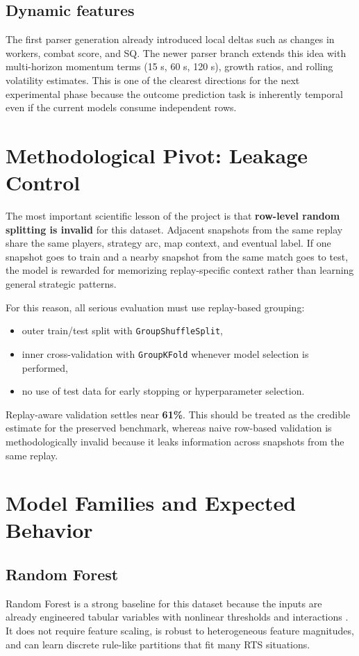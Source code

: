 \documentclass[11pt,a4paper]{article}
\begin{document}
	\subsection{Dynamic features}
	The first parser generation already introduced local deltas such as changes in workers, combat score, and SQ. The newer parser branch extends this idea with multi-horizon momentum terms (15 s, 60 s, 120 s), growth ratios, and rolling volatility estimates. This is one of the clearest directions for the next experimental phase because the outcome prediction task is inherently temporal even if the current models consume independent rows.
	
	\section{Methodological Pivot: Leakage Control}
	The most important scientific lesson of the project is that \textbf{row-level random splitting is invalid} for this dataset. Adjacent snapshots from the same replay share the same players, strategy arc, map context, and eventual label. If one snapshot goes to train and a nearby snapshot from the same match goes to test, the model is rewarded for memorizing replay-specific context rather than learning general strategic patterns.
	
	For this reason, all serious evaluation must use replay-based grouping:
	\begin{itemize}
		\item outer train/test split with \texttt{GroupShuffleSplit},
		\item inner cross-validation with \texttt{GroupKFold} whenever model selection is performed,
		\item no use of test data for early stopping or hyperparameter selection.
	\end{itemize}
	
	\begin{resultbox}
		Replay-aware validation settles near \textbf{61\%}. This should be treated as the credible estimate for the preserved benchmark, whereas naive row-based validation is methodologically invalid because it leaks information across snapshots from the same replay.
	\end{resultbox}
	
	\section{Model Families and Expected Behavior}
	\subsection{Random Forest}
	Random Forest is a strong baseline for this dataset because the inputs are already engineered tabular variables with nonlinear thresholds and interactions \cite{breiman2001rf}. It does not require feature scaling, is robust to heterogeneous feature magnitudes, and can learn discrete rule-like partitions that fit many RTS situations.
	
\end{document}
